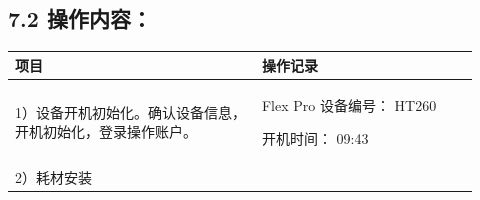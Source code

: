 \documentclass[UTF8,10pt,a4paper,fontset=fandol]{ctexart}
\newcommand{\fieldvalue}[1]{#1}
\newcommand{\handwritten}[1]{#1}
\begin{document}
\subsection{7.2 操作内容：}

\begin{center}
\small
\begin{tabular}{|p{0.49\linewidth}|p{0.43\linewidth}|}
\hline
项目 & 操作记录 \\
\hline
1）设备开机初始化。确认设备信息，开机初始化，登录操作账户。 &
Flex Pro 设备编号：
\fieldvalue{\handwritten{HT260}}

开机时间：
\fieldvalue{\handwritten{09:43}}
\\
\hline
2）耗材安装


\end{tabular}
\end{center}
\end{document}
